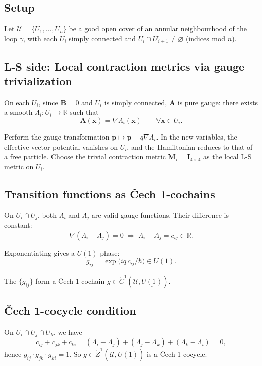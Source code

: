 \documentclass[11pt]{article}
\begin{document}
\subsection{Setup}
\label{sec:setup}

Let $\mathcal{U} = \{U_1, \dots, U_n\}$ be a good open cover of an annular
neighbourhood of the loop $\gamma$, with each $U_i$ simply connected and
$U_i \cap U_{i+1} \neq \varnothing$ (indices mod $n$).

\subsection{L-S side: Local contraction metrics via gauge trivialization}
\label{sec:ls-side}

On each $U_i$, since $\mathbf{B} = 0$ and $U_i$ is simply connected,
$\mathbf{A}$ is pure gauge: there exists a smooth $\Lambda_i: U_i \to \mathbb{R}$
such that
\[
\mathbf{A}(\mathbf{x}) = \nabla\Lambda_i(\mathbf{x}) \qquad \forall \mathbf{x} \in U_i.
\]

Perform the gauge transformation $\mathbf{p} \mapsto \mathbf{p} - q\nabla\Lambda_i$.
In the new variables, the effective vector potential vanishes on $U_i$, and the
Hamiltonian reduces to that of a free particle. Choose the trivial contraction
metric $\mathbf{M}_i = \mathbf{I}_{4\times 4}$ as the local L-S metric on $U_i$.

\subsection{Transition functions as \v{C}ech 1-cochains}
\label{sec:transitions}

On $U_i \cap U_j$, both $\Lambda_i$ and $\Lambda_j$ are valid gauge functions.
Their difference is constant:
\[
\nabla(\Lambda_i - \Lambda_j) = 0 \;\Longrightarrow\; \Lambda_i - \Lambda_j = c_{ij} \in \mathbb{R}.
\]

Exponentiating gives a $U(1)$ phase:
\[
g_{ij} = \exp\!\big(iq\,c_{ij}/\hbar\big) \in U(1).
\]

The $\{g_{ij}\}$ form a \v{C}ech 1-cochain
$g \in \check{C}^1(\mathcal{U}, \underline{U(1)})$.

\subsection{\v{C}ech 1-cocycle condition}
\label{sec:cocycle}

On $U_i \cap U_j \cap U_k$, we have
\[
c_{ij} + c_{jk} + c_{ki} = (\Lambda_i - \Lambda_j) + (\Lambda_j - \Lambda_k)
+ (\Lambda_k - \Lambda_i) = 0,
\]
hence $g_{ij} \cdot g_{jk} \cdot g_{ki} = 1$. So
$g \in \check{Z}^1(\mathcal{U}, \underline{U(1)})$ is a \v{C}ech 1-cocycle.
\end{document}
